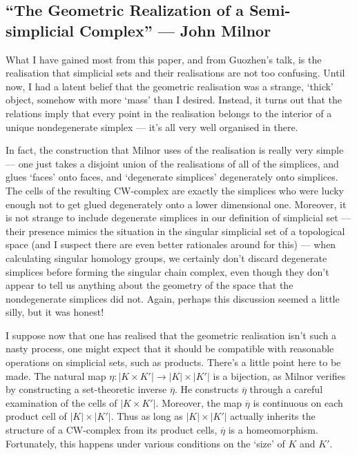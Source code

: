 \documentclass[11pt]{article}
\newcommand{\KanSemResponse}[1]
{
\thispagestyle{fancy}
\section{#1}
}
\begin{document}
\begin{CharacteristicClasses}



\pagebreak
\end{CharacteristicClasses}
\begin{MilnorGeometricRealization}
\KanSemResponse
{``The Geometric Realization of a Semi-simplicial Complex'' --- John Milnor}
What I have gained most from this paper, and from Guozhen's talk, is the realisation that simplicial sets and their realisations are not too confusing. Until now, I had a latent belief that the geometric realisation was a strange, `thick' object, somehow with more `mass' than I desired. Instead, it turns out that the relations imply that every point in the realisation belongs to the interior of a unique nondegenerate simplex --- it's all very well organised in there.

In fact, the construction that Milnor uses of the realisation is really very simple --- one just takes a disjoint union of the realisations of all of the simplices, and glues `faces' onto faces, and `degenerate simplices' degenerately onto simplices. The cells of the resulting CW-complex are exactly the simplices who were lucky enough not to get glued degenerately onto a lower dimensional one. Moreover, it is not strange to include degenerate simplices in our definition of simplicial set --- their presence mimics the situation in the singular simplicial set of a topological space (and I suspect there are even better rationales around for this) --- when calculating singular homology groups, we certainly don't discard degenerate simplices before forming the singular chain complex, even though they don't appear to tell us anything about the geometry of the space that the nondegenerate simplices did not. Again, perhaps this discussion seemed a little silly, but it was honest!

I suppose now that one has realised that the geometric realisation isn't such a nasty process, one might expect that it should be compatible with reasonable operations on simplicial sets, such as products. There's a little point here to be made. The natural map $\eta:|K\times K'|\to|K|\times|K'|$ is a bijection, as Milnor verifies by constructing a set-theoretic inverse $\overline\eta$. He constructs $\overline\eta$ through a careful examination of the cells of $|K\times K'|$. Moreover, the map $\overline\eta$ is continuous on each product cell of $|K|\times|K'|$. Thus as long as $|K|\times|K'|$ actually inherits the structure of a CW-complex from its product cells, $\overline\eta$ is a homeomorphism. Fortunately, this happens under various conditions on the `size' of $K$ and $K'$.


\end{MilnorGeometricRealization}
\end{document}
